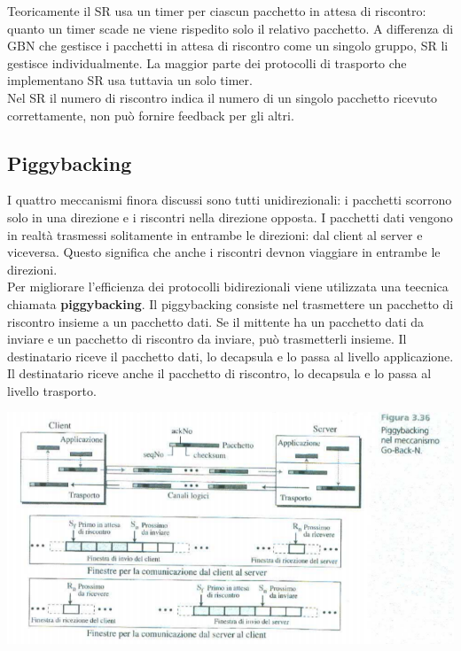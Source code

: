 \documentclass[12pt]{report}
\begin{document}
	Teoricamente il SR usa un timer per ciascun pacchetto in attesa di riscontro: quanto un timer scade ne viene rispedito solo il relativo pacchetto. A differenza di GBN che gestisce i pacchetti in attesa di riscontro come un singolo gruppo, SR li gestisce individualmente. La maggior parte dei protocolli di trasporto che implementano SR usa tuttavia un solo timer.
	\vspace{\baselineskip}\\
	Nel SR il numero di riscontro indica il numero di un singolo pacchetto ricevuto correttamente, non può fornire feedback per gli altri.

	\subsection{Piggybacking}
	I quattro meccanismi finora discussi sono tutti unidirezionali: i pacchetti scorrono solo in una direzione e i riscontri nella direzione opposta. I pacchetti dati vengono in realtà trasmessi solitamente in entrambe le direzioni: dal client al server e viceversa. Questo significa che anche i riscontri devnon viaggiare in entrambe le direzioni.
	\vspace{\baselineskip}\\
	Per migliorare l'efficienza dei protocolli bidirezionali viene utilizzata una teecnica chiamata \textbf{piggybacking}. Il piggybacking consiste nel trasmettere un pacchetto di riscontro insieme a un pacchetto dati. Se il mittente ha un pacchetto dati da inviare e un pacchetto di riscontro da inviare, può trasmetterli insieme. Il destinatario riceve il pacchetto dati, lo decapsula e lo passa al livello applicazione. Il destinatario riceve anche il pacchetto di riscontro, lo decapsula e lo passa al livello trasporto.
	\begin{center}
		\includegraphics[scale=0.5]{assets/piggybacking.png}
	\end{center}
\end{document}
